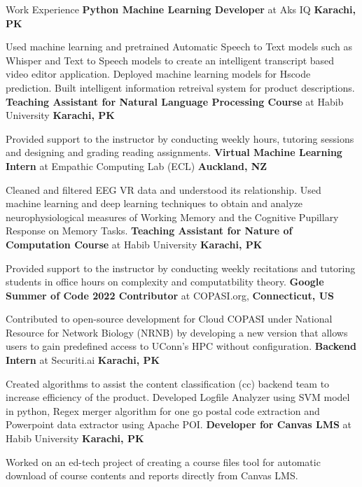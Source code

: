 \begin{rubric}{Work Experience}
%
	\textbf{Python Machine Learning Developer} at Aks IQ \hfill\textbf{Karachi, PK}
        \par Used machine learning and pretrained Automatic Speech to Text models such as Whisper and Text to Speech models to create an intelligent transcript based video editor application. Deployed machine learning models for Hscode prediction. Built intelligent information retreival system for product descriptions.
%
        \textbf{Teaching Assistant for Natural Language Processing Course} at Habib University \hfill\textbf{Karachi, PK}
        \par Provided support to the instructor by conducting weekly hours, tutoring sessions and designing and grading reading assignments.
%
	\textbf{Virtual Machine Learning Intern} at Empathic Computing Lab (ECL) \hfill\textbf{Auckland, NZ}
        \par Cleaned and filtered EEG VR data and understood its relationship. Used machine learning and deep learning techniques to obtain and analyze neurophysiological measures of Working Memory and the Cognitive Pupillary Response on Memory Tasks. 
%
        \textbf{Teaching Assistant for Nature of Computation Course} at Habib University \hfill\textbf{Karachi, PK}
        \par Provided support to the instructor by conducting weekly recitations and tutoring students in office hours on complexity and computatbility theory.
%
	\textbf{Google Summer of Code 2022 Contributor} at COPASI.org, \hfill\textbf{Connecticut, US}
        \par Contributed to open-source development for Cloud COPASI under National Resource for Network Biology (NRNB) by developing a new version that allows users to gain predefined access to UConn's HPC without configuration.
	\textbf{Backend Intern} at Securiti.ai \hfill\textbf{Karachi, PK}
        \par Created algorithms to assist the content classification (cc) backend team to increase efficiency of the product. Developed
Logfile Analyzer using SVM model in python, Regex merger algorithm for one go postal code extraction and Powerpoint data extractor using Apache POI.
%
	\textbf{Developer for Canvas LMS} at Habib University \hfill\textbf{Karachi, PK}
        \par Worked on an ed-tech project of creating a course files tool for automatic download of course contents and reports directly from Canvas LMS.

\end{rubric}
